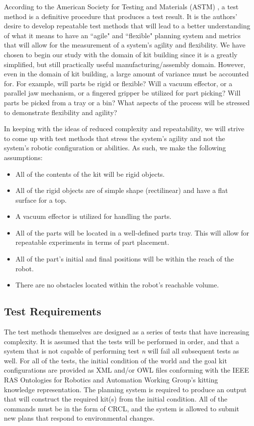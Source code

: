 According to the American Society for Testing and Materials (ASTM) \cite[p. vii]{ASTM99}, a test method is a
definitive procedure that produces a test result. It is the authors' desire to develop repeatable test methods that will
lead to a better understanding of what it means to have an ``agile" and ``flexible" planning system and metrics that
will allow for the measurement of a system's agility and flexibility. We have chosen to begin our study
with the domain of kit building since it is a greatly simplified, but still practically useful manufacturing/assembly domain. However,
even in the domain of kit building, a large amount of variance  must be accounted for. For
example, will parts be rigid or flexible? Will a vacuum effector, or a parallel jaw mechanism, or a fingered
gripper be utilized for part picking? Will parts be picked from a tray or a bin? What aspects of the
process will be stressed to demonstrate flexibility and agility?

In keeping with the ideas of reduced complexity and repeatability, we will strive to come up with test methods that stress
the system's agility and not the system's robotic configuration or abilities. As such, we make the following assumptions:
\begin{itemize}
	\item All of the contents of the kit will be rigid objects.
	\item All of the rigid objects are of simple shape (rectilinear) and have a flat surface for a top.
	\item A vacuum effector is utilized for handling the parts.
	\item All of the parts will be located in a well-defined parts tray. This will allow for repeatable experiments in terms of part placement.
	\item All of the part's initial and final positions will be within the reach of the robot.
	\item There are no obstacles located within the robot's reachable volume.
\end{itemize}

\subsection{Test Requirements}
The test methods themselves are designed as a series of tests that have increasing complexity. It is assumed that the tests will be performed
in order, and that a system that is not capable of performing test {\it n} will fail all subsequent tests as well. For all of the tests,
the initial condition of the world and the goal kit configurations are provided as XML and/or OWL files conforming with the IEEE RAS Ontologies
for Robotics and Automation Working Group's kitting knowledge representation. The planning system is required to produce an output that
will construct the required kit(s) from the initial condition. All of the commands must be in the form of CRCL, and the system
is allowed to submit new plans that respond to environmental changes.

